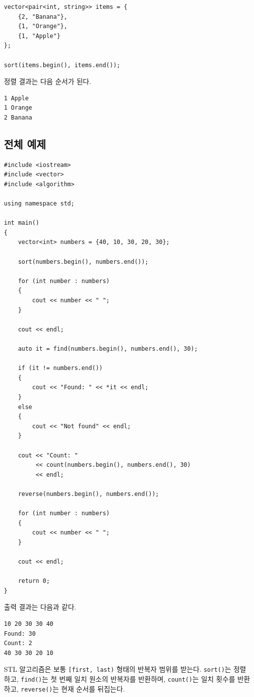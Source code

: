\documentclass[11pt,a4paper]{article}
\begin{document}
\begin{lstlisting}
vector<pair<int, string>> items = {
    {2, "Banana"},
    {1, "Orange"},
    {1, "Apple"}
};

sort(items.begin(), items.end());
\end{lstlisting}

정렬 결과는 다음 순서가 된다.

\begin{verbatim}
1 Apple
1 Orange
2 Banana
\end{verbatim}

\subsection{전체 예제}
\begin{lstlisting}
#include <iostream>
#include <vector>
#include <algorithm>

using namespace std;

int main()
{
    vector<int> numbers = {40, 10, 30, 20, 30};

    sort(numbers.begin(), numbers.end());

    for (int number : numbers)
    {
        cout << number << " ";
    }

    cout << endl;

    auto it = find(numbers.begin(), numbers.end(), 30);

    if (it != numbers.end())
    {
        cout << "Found: " << *it << endl;
    }
    else
    {
        cout << "Not found" << endl;
    }

    cout << "Count: "
         << count(numbers.begin(), numbers.end(), 30)
         << endl;

    reverse(numbers.begin(), numbers.end());

    for (int number : numbers)
    {
        cout << number << " ";
    }

    cout << endl;

    return 0;
}
\end{lstlisting}

출력 결과는 다음과 같다.

\begin{verbatim}
10 20 30 30 40
Found: 30
Count: 2
40 30 30 20 10
\end{verbatim}

\begin{importantbox}
STL 알고리즘은 보통 \texttt{[first, last)} 형태의 반복자 범위를 받는다. \texttt{sort()}는 정렬하고, \texttt{find()}는 첫 번째 일치 원소의 반복자를 반환하며, \texttt{count()}는 일치 횟수를 반환하고, \texttt{reverse()}는 현재 순서를 뒤집는다.
\end{importantbox}
\end{document}
